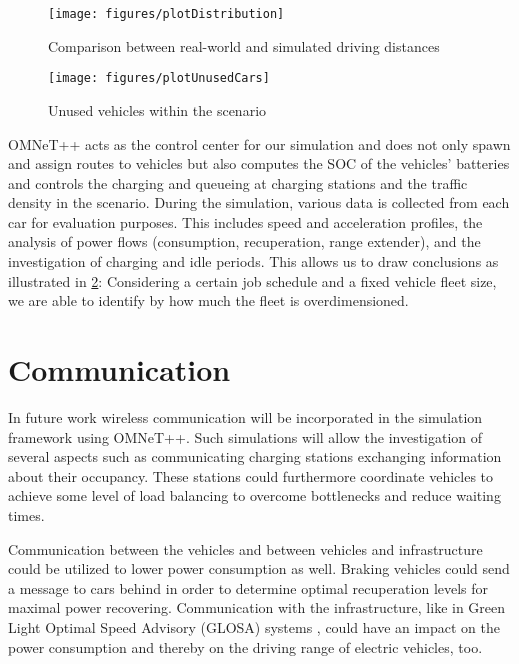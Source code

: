 \documentclass[conference]{IEEEtran}
\begin{document}
\begin{figure}[!h]
\centering
\texttt{[image: figures/plotDistribution]}
\caption{Comparison between real-world and simulated driving distances}
\label{fig:hist}
\end{figure}

\begin{figure}[h]
\centering
\texttt{[image: figures/plotUnusedCars]}
\caption{Unused vehicles within the scenario}
\label{fig:unused}
\end{figure}

OMNeT++ acts as the control center for our simulation and does not only spawn and assign routes to vehicles but also computes the SOC of the vehicles' batteries and controls the charging and queueing at charging stations and the traffic density in the scenario.
During the simulation, various data is collected from each car for evaluation purposes.
This includes speed and acceleration profiles, the analysis of power flows (consumption, recuperation, range extender), and the investigation of charging and idle periods.
This allows us to draw conclusions as illustrated in \cref{fig:unused}: Considering a certain job schedule and a fixed vehicle fleet size, we are able to identify by how much the fleet is overdimensioned.


\section{Communication}

In future work wireless communication will be incorporated in the simulation framework using OMNeT++.
Such simulations will allow the investigation of several aspects such as communicating charging stations exchanging information about 
their occupancy. 
These stations could furthermore coordinate vehicles to achieve some level of load balancing to overcome bottlenecks and reduce waiting times.

Communication between the vehicles and between vehicles and infrastructure could be utilized to lower power consumption as well.
Braking vehicles could send a message to cars behind in order to determine optimal recuperation levels for maximal power recovering.
Communication with the infrastructure, like in Green Light Optimal Speed Advisory (GLOSA) systems \cite{eckhoff2013potentials,tielert2012communication}, could have an impact on the power consumption and thereby on the driving range of electric vehicles, too.
\end{document}

